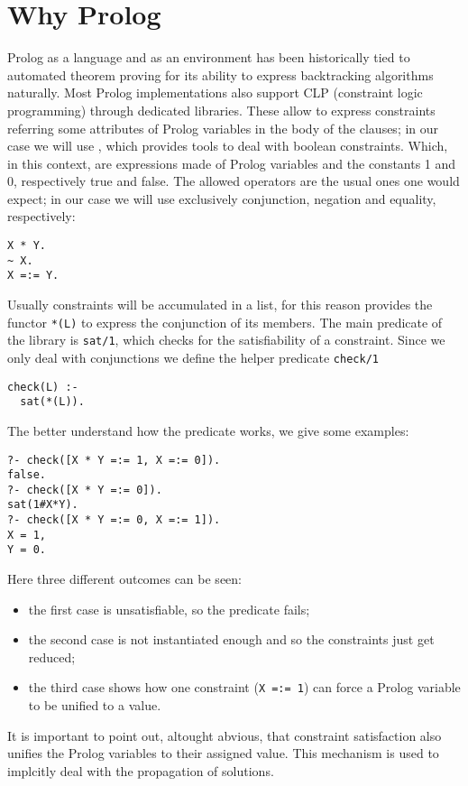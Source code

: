 \section{Why Prolog}
Prolog as a language and as an environment has been historically tied to automated theorem proving for its ability to express backtracking algorithms naturally.
Most Prolog implementations also support CLP (constraint logic programming) through dedicated libraries.
These allow to express constraints referring some attributes of Prolog variables in the body of the clauses; in our case we will use \CLPB{} \cite{clpb}, which provides tools to deal with boolean constraints.
Which, in this context, are expressions made of Prolog variables and the constants 1 and 0, respectively true and false.
The allowed operators are the usual ones one would expect; in our case we will use exclusively conjunction, negation and equality, respectively:
\begin{verbatim}
X * Y.
~ X.
X =:= Y.
\end{verbatim}
Usually constraints will be accumulated in a list, for this reason \CLPB{} provides the functor \texttt{*(L)} to express the conjunction of its members.
The main predicate of the library is \texttt{sat/1}, which checks for the satisfiability of a constraint.
Since we only deal with conjunctions we define the helper predicate \texttt{check/1}
\begin{verbatim}
check(L) :-
  sat(*(L)).
\end{verbatim}
The better understand how the predicate works, we give some examples:
\begin{verbatim}
?- check([X * Y =:= 1, X =:= 0]).
false.
?- check([X * Y =:= 0]).
sat(1#X*Y).
?- check([X * Y =:= 0, X =:= 1]).
X = 1,
Y = 0.
\end{verbatim}
Here three different outcomes can be seen:
\begin{itemize}
	\item the first case is unsatisfiable, so the predicate fails;
	\item the second case is not instantiated enough and so the constraints just get reduced;
	\item the third case shows how one constraint (\texttt{X =:= 1}) can force a Prolog variable to be unified to a value.
\end{itemize}
It is important to point out, altought abvious, that constraint satisfaction also unifies the Prolog variables to their assigned value.
This mechanism is used to implcitly deal with the propagation of solutions.

